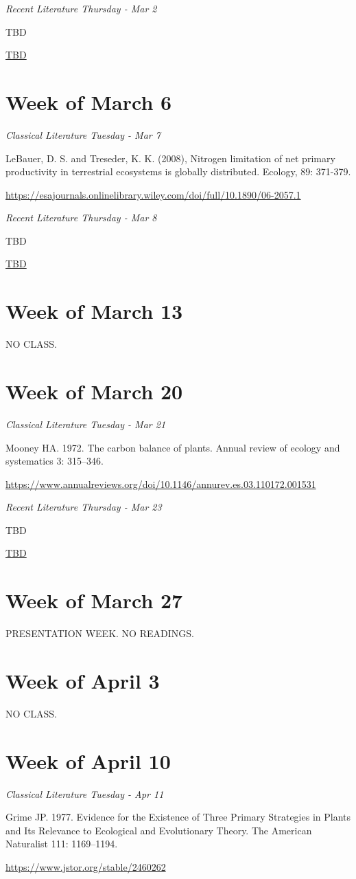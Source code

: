 \documentclass[12pt, notitlepage]{article}   	%
\begin{document}
{\textit{Recent Literature Thursday - Mar 2} \par
TBD \par
\url{TBD}

\section*{Week of March 6}
\textit{Classical Literature Tuesday - Mar 7} \par
LeBauer, D. S. and Treseder, K. K. (2008), Nitrogen limitation of net primary productivity
in terrestrial ecosystems is globally distributed. Ecology, 89: 371-379. \par
\url{https://esajournals.onlinelibrary.wiley.com/doi/full/10.1890/06-2057.1}

\textit{Recent Literature Thursday - Mar 8} \par
TBD \par
\url{TBD}

\section*{Week of March 13}
NO CLASS.

\section*{Week of March 20}
\textit{Classical Literature Tuesday - Mar 21} \par
Mooney HA. 1972. The carbon balance of plants. 
Annual review of ecology and systematics 3: 315–346. \par
\url{https://www.annualreviews.org/doi/10.1146/annurev.es.03.110172.001531}

\textit{Recent Literature Thursday - Mar 23} \par
TBD \par
\url{TBD}

\section*{Week of March 27}
PRESENTATION WEEK. NO READINGS.

\section*{Week of April 3}
NO CLASS.

\section*{Week of April 10}
\textit{Classical Literature Tuesday - Apr 11} \par
Grime JP. 1977. Evidence for the Existence of Three Primary Strategies in Plants and Its 
Relevance to Ecological and Evolutionary Theory. 
The American Naturalist 111: 1169–1194. \par
\url{https://www.jstor.org/stable/2460262}

}
\end{document}
